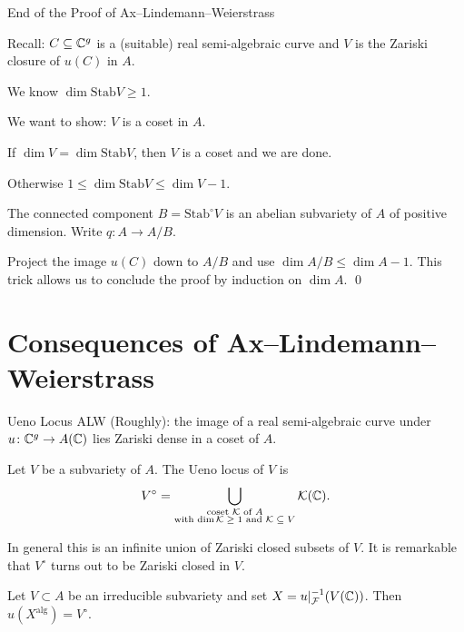 \documentclass{beamer}
\begin{document}
\begin{frame}{End of the Proof of
    Ax--Lindemann--Weierstrass}

  Recall: $C\subseteq {\mathbb{C}}^g$ is a (suitable) real semi-algebraic curve and $V$ is the
  Zariski closure of $u(C)$ in $A$.

  We know $\dim\mathrm{Stab} V\ge 1$.

  We want to show: $V$ is a coset in $A$. 

  If $\dim V = \dim \mathrm{Stab} V$, then $V$ is a coset and we are
  done.

  Otherwise $1\le \dim \mathrm{Stab} V \le \dim V-1$.
  
  The connected component $B = \mathrm{Stab}^\circ V$ is an abelian
  subvariety of $A$ of positive dimension. Write $q\colon A\rightarrow
  A/B$.

  Project the image $u(C)$ down
  to $A/B$ and use $\dim A/B \le \dim A-1$. This trick allows us to
  conclude the proof by induction on $\dim A$. \qed
\end{frame}

\section{Consequences of Ax--Lindemann--Weierstrass}

\begin{frame}{Ueno Locus}
  ALW (Roughly): the image of a real semi-algebraic curve under
  $u\colon {\mathbb{C}}^g\rightarrow A({\mathbb{C}})$ lies Zariski dense in a coset of
  $A$.
  
  \begin{definition}
    Let $V$ be a subvariety of $A$. The \alert{Ueno locus} of $V$ is 
    \begin{equation*}
      V^{\circ} = \bigcup_{\substack{\text{coset ${\mathcal K}$ of $A$} \\\text{with $\dim
            {\mathcal K}\ge 1$ and ${\mathcal K}\subseteq
            V$}}} {\mathcal K}({\mathbb{C}}).
    \end{equation*}
  \end{definition}

  In general this is an \alert{infinite} union of Zariski closed
  subsets of $V$. It is 
  remarkable that $V^{\circ}$  turns out to be Zariski closed in $V$.

  \begin{theorem}
    Let $V\subset A$ be an irreducible subvariety and set
    $X = u|_{{\mathcal F}}^{-1}(V({\mathbb{C}}))$.
    Then $u(X^{\mathrm{alg}}) = V^{\circ}$.
  \end{theorem}

\end{frame}
\end{document}
